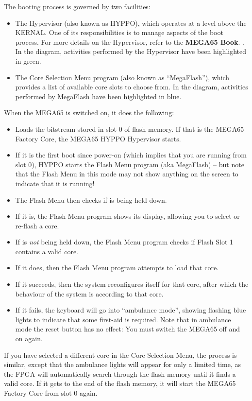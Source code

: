 The booting process is governed by two facilities:
\begin{itemize}
  \item The Hypervisor (also known as HYPPO), which operates at a level above the KERNAL. One of its responsibilities is to manage aspects of the boot process. For more details on the Hypervisor, refer to
\ifdefined\printmanual
the {\bf MEGA65 Book}.
\else
 .
\fi
    In the diagram, activities performed by the Hypervisor have been highlighted in green.
  \item The Core Selection Menu program (also known as ``MegaFlash''), which provides a list of available core slots to choose from. In the diagram, activities performed by MegaFlash have been highlighted in blue.
\end{itemize}

When the MEGA65 is switched on, it does the following:
\begin{itemize}
\item Loads the bitstream stored in slot 0 of flash memory. If that is the MEGA65 Factory Core, the MEGA65
  HYPPO Hypervisor starts.
\item If it is the first boot since power-on (which implies that you are running from slot 0), HYPPO starts the Flash Menu program (aka MegaFlash) -- but note that the Flash Menu in
      this mode may not show anything on the screen to indicate that it is running!
\item The Flash Menu then checks if  is being held down.
\item If it is, the Flash Menu program shows its display, allowing you to select or re-flash a core.
\item If  is {\em not} being held down, the Flash Menu program checks if Flash Slot 1 contains a valid
      core.
\item If it does, then the Flash Menu program attempts to load that core.
\item If it succeeds, then the system reconfigures itself for that core, after which the behaviour of the system is
      according to that core.
\item If it fails, the keyboard will go into ``ambulance mode'', showing flashing blue lights to indicate that some
      first-aid is required. Note that in ambulance mode the reset button has no effect: You must switch the
      MEGA65 off and on again.
\end{itemize}

If you have selected a different core in the Core Selection Menu, the process is similar, except that the ambulance lights will appear for only a limited time, as the FPGA will automatically search through the flash memory until it finds a valid core. If it gets to the end of the flash memory, it will start the MEGA65 Factory Core from slot 0 again.
